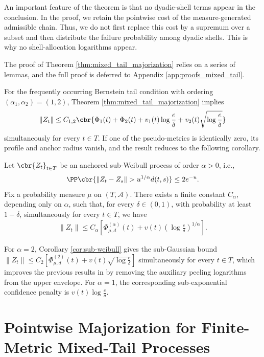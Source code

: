 \documentclass[11pt]{article}
\begin{document}
An important feature of the theorem is that no dyadic-shell terms appear in the conclusion. In the proof, we retain the pointwise cost of the
measure-generated admissible chain. Thus, we do not first replace this
cost by a supremum over a subset and then distribute the failure
probability among dyadic shells. This is why no shell-allocation
logarithms appear.

The proof of Theorem \ref{thm:mixed_tail_majorization} relies on a
series of lemmas, and the full proof is deferred to
Appendix \ref{app:proofs_mixed_tail}.

For the frequently occurring Bernstein tail condition with ordering
$(\alpha_1,\alpha_2)=(1,2)$, Theorem \ref{thm:mixed_tail_majorization} implies
\begin{align*}
\|Z_t\|
\le
C_{1,2}
\cbr{
\Phi_1(t)+\Phi_2(t)
+v_1(t)\log\frac{e}{\delta}
+v_2(t)\sqrt{\log\frac{e}{\delta}}
}
\end{align*}
simultaneously for every $t\in T$. If one of the pseudo-metrics is
identically zero, its profile and anchor radius vanish, and the result
reduces to the following corollary.
\begin{corollary}\label{cor:sub-weibull}
Let $\cbr{Z_t}_{t\in T}$ be an anchored
sub-Weibull process of order $\alpha>0$, i.e., 
\begin{align*}
\PP\cbr{
\|Z_t-Z_s\|>u^{1/\alpha}d(t,s)
}
\le 2e^{-u}.
\end{align*}
Fix a probability
measure $\mu$ on $(T,\mathcal A)$. There exists a finite constant $C_\alpha$,
depending only on $\alpha$, such that, for every $\delta\in(0,1)$, with
probability at least $1-\delta$, simultaneously for every $t\in T$, we
have
\begin{align*}
\|Z_t\|
\le
C_\alpha
\left[
\Phi_{\mu,d}^{(\alpha)}(t)
+
v(t)
\left(
\log\frac{e}{\delta}
\right)^{1/\alpha}
\right].
\end{align*}
\end{corollary}
For $\alpha=2$, Corollary \ref{cor:sub-weibull} gives the
sub-Gaussian bound $\|Z_t\|
\le
C_2
\left[
\Phi_{\mu,d}^{(2)}(t)
+
v(t)\sqrt{\log\frac{e}{\delta}}
\right]$
simultaneously for every $t\in T$, which improves the previous results in \citet{xu2026} by removing the auxiliary peeling logarithms from the upper envelope. For $\alpha=1$, the
corresponding sub-exponential confidence penalty is $v(t)\log\frac{e}{\delta}$.

\section{Pointwise Majorization for Finite-Metric Mixed-Tail Processes}
\label{sec:multi_regime_majorization}
\end{document}
